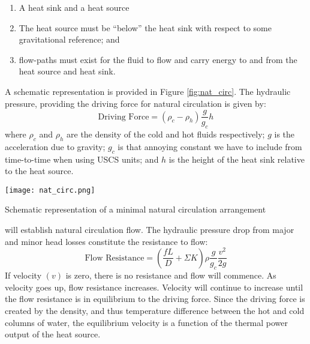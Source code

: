 \begin{enumerate}
\item A heat sink and a heat source
\item The heat source must be ``below'' the heat sink with respect to some gravitational reference; and
\item flow-paths must exist for the fluid to flow and carry energy to and from the heat source and heat sink.
\end{enumerate}
A schematic representation is provided in Figure \ref{fig:nat_circ}.  The hydraulic pressure, providing the driving force for natural circulation is given by:
$$\text{Driving Force} = \left(\rho_c - \rho_h \right) \frac{g}{g_c}h $$
where $\rho_c$ and $\rho_h$ are the density of the cold and hot fluids respectively; $g$ is the acceleration due to gravity; $g_c$ is that annoying constant we have to include from time-to-time when using USCS units; and $h$ is the height of the heat sink relative to the heat source.
\begin{marginfigure}
\texttt{[image: nat\_circ.png]}
\caption{Schematic representation of a minimal natural circulation arrangement}
\label{fig:nat_circ}
\end{marginfigure}

 will establish natural circulation flow.  The hydraulic pressure drop from major and minor head losses constitute the resistance to flow:
$$\text{Flow Resistance} = \left(\frac{fL}{D} + \Sigma K \right) \rho \frac{g}{g_c}\frac{v^2}{2g} $$
If velocity $(v)$ is zero, there is no resistance and flow will commence. As velocity goes up, flow resistance increases.  Velocity will continue to increase until the flow resistance is in equilibrium to the driving force.  Since the driving force is created by the density, and thus temperature difference between the hot and cold columns of water, the equilibrium velocity is a function of the thermal power output of the heat source. 

